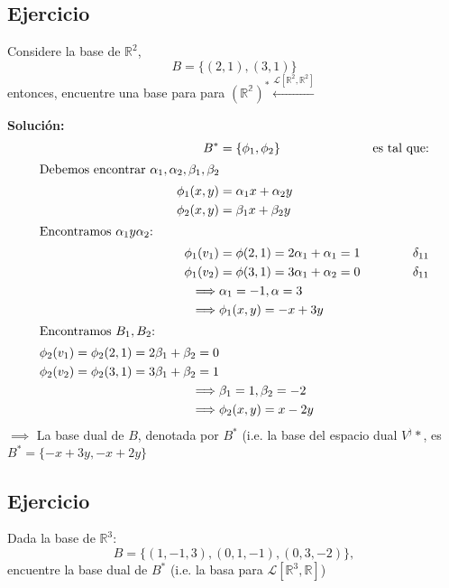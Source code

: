 \subsection{Ejercicio}
\begin{exercise}
Considere la base de $\mathbb{R}^2$,
$$B=\{(2,1),(3,1)\}$$
entonces, encuentre una base para para $(\mathbb{R^2})^{*}\xleftarrow{\mathcal{L}[\mathbb{R}^2,\mathbb{R}^2]}$
\end{exercise}

\textbf{Solución:}
\begin{align}
    B^* &= \{\phi_1,\phi_2\} & \text{es tal que:}\\
    \intertext{Debemos encontrar $\alpha_1,\alpha_2,\beta_1,\beta_2$}
    \phi_1(x,y)&=\alpha_1 x+\alpha_2 y\\ 
    \phi_2(x,y)&=\beta_1 x+\beta_2 y\\
    \intertext{Encontramos $\alpha_1 y \alpha_2$:}
    \phi_1(v_1)&=\phi(2,1)=2\alpha_1+\alpha_1=1  & \delta_{11}\\
    \phi_1(v_2)&=\phi(3,1)=3\alpha_1+\alpha_2=0  & \delta_{11}\\
    \implies &\alpha_1=-1, \alpha=3\\
    \implies & \phi_1(x,y)=-x+3y\\
    \intertext{Encontramos $B_1,B_2$:}
    \phi_2(v_1)=\phi_2(2,1)= 2\beta_1+\beta_2 =0\\ 
    \phi_2(v_2)=\phi_2(3,1)= 3\beta_1+\beta_2 =1\\
    \implies & \beta_1=1,\beta_2=-2\\
    \implies &\phi_2(x,y) =x -2y 
\end{align}
$\implies$ La base dual de $B$, denotada por $B^*$ (i.e. la base del espacio dual $V^)*$, es \\$B^{*}=\{-x+3y,-x+2y\}$

\subsection{Ejercicio}
\begin{exercise}
Dada la base de $\mathbb{R}^3$:\\
$$B=\{(1,-1,3),(0,1,-1),(0,3,-2)\},$$
encuentre la base dual de $B^*$ (i.e. la basa para $\mathcal{L}[\mathbb{R}^3,\mathbb{R}]$)
\end{exercise}


